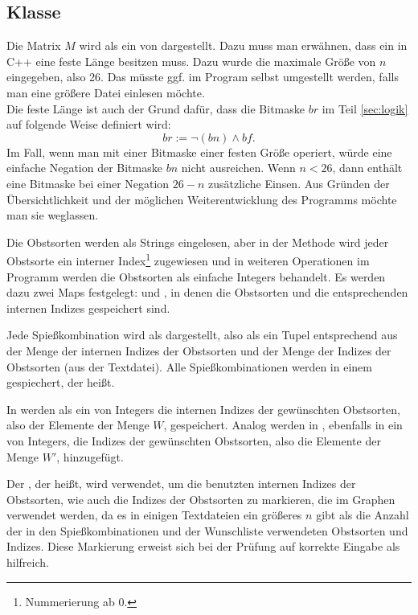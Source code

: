 \subsection{Klasse }
Die Matrix $M$ wird als ein  von  dargestellt.
Dazu muss man erwähnen, dass ein  in C++ eine feste Länge besitzen muss.
Dazu wurde die maximale Größe von $n$ eingegeben, also 26.
Das müsste ggf. im Program selbst umgestellt werden,
falls man eine größere Datei einlesen möchte.\\
Die feste Länge ist auch der Grund dafür, dass die Bitmaske $br$ im Teil \ref{sec:logik}
auf folgende Weise definiert wird:
\[
br := \neg(bn) \land bf.
\]
Im Fall, wenn man mit einer Bitmaske einer festen Größe operiert, würde 
eine einfache Negation der Bitmaske $bn$ nicht ausreichen. Wenn $n < 26$, dann enthält 
eine Bitmaske bei einer Negation $26 - n$ zusätzliche Einsen. Aus Gründen der Übersichtlichkeit 
und der möglichen Weiterentwicklung des Programms möchte man sie weglassen.

Die Obstsorten werden als Strings eingelesen, aber in der Methode 
wird jeder Obstsorte ein interner Index\footnote{Nummerierung ab 0.} zugewiesen
und in weiteren Operationen im Programm
werden die Obstsorten als einfache Integers behandelt. 
Es werden dazu zwei Maps festgelegt:  und , 
in denen die Obstsorten und die entsprechenden internen Indizes gespeichert sind.

Jede Spießkombination wird als  dargestellt, also als ein Tupel entsprechend
aus der Menge der internen Indizes der Obstsorten und der Menge der Indizes der Obstsorten (aus der Textdatei).
Alle Spießkombinationen werden in einem  gespiechert, der  heißt.

In  werden als ein  von Integers die internen Indizes der gewünschten 
Obstsorten, also der Elemente der Menge $W$, gespeichert.
Analog werden in , ebenfalls in ein  von Integers, die Indizes der gewünschten 
Obstsorten, also die Elemente der Menge $W'$, hinzugefügt.

Der , der  heißt, wird verwendet, um die benutzten internen Indizes der Obstsorten,
wie auch die Indizes der Obstsorten zu markieren, die im Graphen verwendet werden,
da es in einigen Textdateien ein größeres $n$ gibt als die Anzahl der in den Spießkombinationen 
und der Wunschliste verwendeten Obstsorten und Indizes. 
Diese Markierung erweist sich bei der Prüfung auf korrekte Eingabe als hilfreich.

